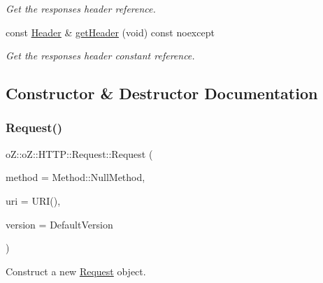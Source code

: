 \begin{DoxyCompactItemize}
\begin{DoxyCompactList}\small\item\em Get the response\textquotesingle{}s header reference. \end{DoxyCompactList}\item 
const \mbox{\hyperlink{classo_z_1_1o_z_1_1_h_t_t_p_1_1_header}{Header}} \& \mbox{\hyperlink{classo_z_1_1o_z_1_1_h_t_t_p_1_1_request_a6d9b74125b18ffd91062fa69fdadb3c9}{get\+Header}} (void) const noexcept
\begin{DoxyCompactList}\small\item\em Get the response\textquotesingle{}s header constant reference. \end{DoxyCompactList}\end{DoxyCompactItemize}


\subsection{Constructor \& Destructor Documentation}
\mbox{\label{classo_z_1_1o_z_1_1_h_t_t_p_1_1_request_ac0740316198c643722554b1b25b1de9c}} 
\subsubsection{\texorpdfstring{Request()}{Request()}\hspace{0.1cm}{\footnotesize\ttfamily [1/3]}}
{\footnotesize\ttfamily o\+Z\+::o\+Z\+::\+H\+T\+T\+P\+::\+Request\+::\+Request (\begin{DoxyParamCaption}\item[{Method}]{method = {\ttfamily Method\+:\+:NullMethod},  }\item[{U\+RI \&\&}]{uri = {\ttfamily URI()},  }\item[{Version}]{version = {\ttfamily DefaultVersion} }\end{DoxyParamCaption})\hspace{0.3cm}{\ttfamily [inline]}}



Construct a new \mbox{\hyperlink{classo_z_1_1o_z_1_1_h_t_t_p_1_1_request}{Request}} object. 

\mbox{\label{classo_z_1_1o_z_1_1_h_t_t_p_1_1_request_a0200643038d42ef71b06579ce9423e7f}} 
